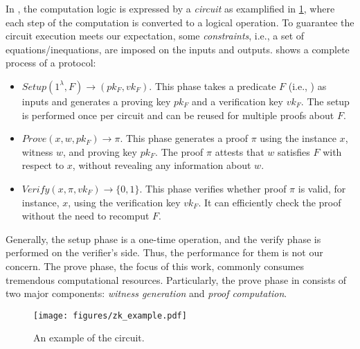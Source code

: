In {\zk}, the computation logic is expressed by a \emph{circuit} as examplified in \cref{fig:ex_zk_circuit}, where each step of the computation is converted to a logical operation. To guarantee the circuit execution meets our expectation, some \emph{constraints}, i.e., a set of equations/inequations, are imposed on the inputs and outputs.   shows a complete process of a \zk protocol:
\begin{itemize}[leftmargin=*]
    \item $Setup(1^\lambda,F)\to(pk_F,vk_F)$. This phase takes a predicate $F$ (i.e., ) as inputs and generates a proving key $pk_F$ and a verification key $vk_F$. The setup is performed once per circuit and can be reused for multiple proofs about $F$.
        
    \item $Prove(x,w,pk_F)\to\pi$. This phase generates a proof $\pi$ using the instance $x$, witness $w$, and proving key $pk_F$. The proof $\pi$ attests that $w$ satisfies $F$ with respect to $x$, without revealing any information about $w$.
    
    \item $Verify(x,\pi,vk_F)\to\{0,1\}$. This phase verifies whether proof $\pi$ is valid, for instance, $x$, using the verification key $vk_F$. It can efficiently check the proof without the need to recomput $F$.
\end{itemize}

Generally, the setup phase is a one-time operation, and the verify phase is performed on the verifier's side. Thus, the performance for them is not our concern. The prove phase, the focus of this work, commonly consumes tremendous computational resources. Particularly, the prove phase in \zk consists of two major components: \emph{witness generation} and \emph{proof computation}. 




\begin{figure}[t]
    \centering
    \texttt{[image: figures/zk\_example.pdf]}
    \caption{An example of the \zk circuit. }
    \label{fig:ex_zk_circuit}
\end{figure}


 





